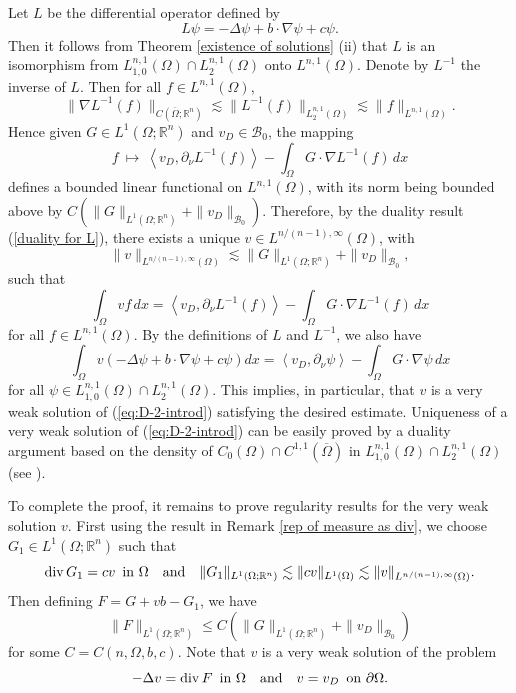 \documentclass[reqno,centertags,11pt]{amsart}
\theoremstyle{definition}
\numberwithin{thm}{section}
\numberwithin{equation}{section}
\newcommand{\R}{{\mathbb{R}}}
\begin{document}
Let $L$ be the differential operator defined by
\[
L \psi  = -\Delta \psi  +b \cdot \nabla \psi + c\psi  .
\]
Then it follows from Theorem \ref{existence of solutions} (ii)  that $L$ is an isomorphism from $L_{1,0}^{n,1}(\Omega )\cap L_2^{n,1}(\Omega)$ onto $L^{n,1}(\Omega )$.
Denote by $L^{-1}$ the inverse of $L$. Then for all $f \in L^{n,1}(\Omega )$,
\[
\|\nabla L^{-1}(f) \|_{C (\overline{\Omega}; \R^n )} \lesssim \|  L^{-1}(f) \|_{L_2^{n,1} (\Omega  )}\lesssim \|f \|_{L^{n,1} (\Omega )}.
\]
Hence given $G \in L^1 (\Omega ; \R^n )$ and  $v_D \in \mathcal{B}_0$, the mapping
\[
 f \ \mapsto \  \left\langle v_D ,   \partial_\nu L^{-1}(f)  \right\rangle - \int_\Omega G \cdot \nabla L^{-1}(f) \, dx
\]
defines a bounded linear functional   on $L^{n,1}(\Omega )$, with its norm being bounded above by $C \left(\|G\|_{L^1 (\Omega ; \R^n )} + \|v_D \|_{\mathcal{B}_0 } \right)$. Therefore, by the duality result (\ref{duality for L}), there exists a unique $v \in L^{n/(n-1),\infty}(\Omega )$, with
$$
\|v\|_{L^{n/(n-1),\infty}(\Omega )} \lesssim  \|G\|_{L^1 (\Omega ; \R^n )}
+ \|v_D \|_{\mathcal{B}_0} ,
$$
such that
\[
\int_\Omega vf \, dx =  \left\langle v_D ,   \partial_\nu L^{-1}(f)   \right\rangle - \int_\Omega G \cdot \nabla L^{-1}(f) \, dx
\]
for all $f\in L^{n,1}(\Omega )$. By the definitions of $L$ and $L^{-1}$, we also have
\[
\int_\Omega v\left( -\Delta \psi  +b \cdot \nabla \psi + c\psi\right)  dx =  \left\langle v_D ,   \partial_\nu \psi  \right\rangle - \int_\Omega G \cdot \nabla \psi  \, dx
\]
for all $\psi \in  L_{1,0}^{n,1}(\Omega )\cap L_2^{n,1}(\Omega)$. This implies, in particular, that $v$ is a   very weak solution   of  (\ref{eq:D-2-introd}) satisfying the desired estimate. Uniqueness of a very weak solution of (\ref{eq:D-2-introd}) can be easily proved by a duality argument based on the  density of $C_0 (\Omega )\cap C^{1,1}(\overline{\Omega})$ in $L_{1,0}^{n,1}(\Omega )\cap L_2^{n,1}(\Omega)$ (see \cite[Lemma 2.10 (iv)]{KO}).

To complete the proof, it remains to prove regularity results for the very weak solution $v$.
First using the result in  Remark \ref{rep of measure as div},
we choose $G_1 \in L^1 (\Omega ; \R^n )$ such that
\[
{\rm div}\, G_1 = cv \,\,\,\mbox{in}\,\,\Omega \quad \mbox{and}\quad \|G_1 \|_{L^1 (\Omega ;\R^n   )} \lesssim  \|c v\|_{L^1 (\Omega  )} \lesssim \|v\|_{L^{n/(n-1),\infty}(\Omega )} .
\]
Then defining $F  = G + v b -G_1 $, we have
\[
\|F \|_{L^1 (\Omega ;\R^n   )} \le C \left(\|G\|_{L^1 (\Omega ; \R^n )}
+ \|v_D \|_{\mathcal{B}_0 }  \right)
\]
for some $C=C(n,\Omega , b,c)$. Note that  $v $  is a very weak solution of the problem
\begin{equation}\label{Poisson with boundary data}
- \Delta v = {\rm div}\, F \,\,\,\mbox{in}\,\, \Omega
\quad\mbox{and}\quad v =v_D \,\,\,\mbox{on}\,\,\partial\Omega.
\end{equation}
\end{document}
